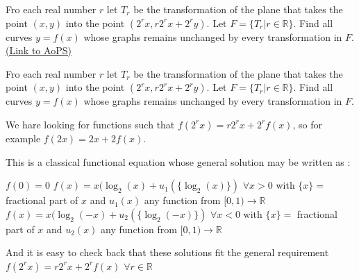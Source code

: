 \begin{problem}
	Fro each real number $ r$ let $ T_r$ be the transformation of the plane that takes the point $ (x,y)$ into the point $ (2^r x,r 2^r x +2^r y)$. Let $ F=\{ T_r | r \in \mathbb{R} \}$. Find all curves $ y=f(x)$ whose graphs remains unchanged by every transformation in $ F$.
	\flushright \href{https://artofproblemsolving.com/community/c6h284588}{(Link to AoPS)}
\end{problem}



\begin{solution}
	\begin{tcolorbox}Fro each real number $ r$ let $ T_r$ be the transformation of the plane that takes the point $ (x,y)$ into the point $ (2^r x,r 2^r x + 2^r y)$. Let $ F = \{ T_r | r \in \mathbb{R} \}$. Find all curves $ y = f(x)$ whose graphs remains unchanged by every transformation in $ F$.\end{tcolorbox}

We hare looking for functions such that $ f(2^rx) = r2^rx + 2^rf(x)$, so for example $ f(2x) = 2x + 2f(x)$. 

This is a classical functional equation whose general solution may be written as :

$ f(0) = 0$
$ f(x) = x(\log_2(x) + u_1(\{\log_2(x)\})$ $ \forall x > 0$ with $ \{x\} =$ fractional part of $ x$ and $ u_1(x)$ any function from $ [0,1)\to\mathbb R$
$ f(x) = x(\log_2( - x) + u_2(\{\log_2( - x)\})$ $ \forall x < 0$ with $ \{x\} =$ fractional part of $ x$ and $ u_2(x)$ any function from $ [0,1)\to\mathbb R$

And it is easy to check back that these solutions fit the general requirement $ f(2^rx) = r2^rx + 2^rf(x)$ $ \forall r\in\mathbb R$
\end{solution}



